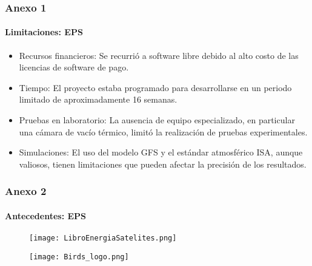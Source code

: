 
\begin{frame}
    \frametitle{Anexo 1}
    \framesubtitle{Limitaciones: EPS}
    \begin{itemize}
        \small
        \item Recursos financieros: Se recurrió a software libre debido al alto costo de las licencias de software de pago.
        \item Tiempo: El proyecto estaba programado para desarrollarse en un periodo limitado de aproximadamente 16 semanas.
        \item Pruebas en laboratorio: La ausencia de equipo especializado, en particular una cámara de vacío térmico, limitó la realización de pruebas experimentales.
        \item Simulaciones: El uso del modelo GFS y el estándar atmosférico ISA, aunque valiosos, tienen limitaciones que pueden afectar la precisión de los resultados.
    \end{itemize}
\end{frame}


\begin{frame}
    \frametitle{Anexo 2}
    \framesubtitle{Antecedentes: EPS}
    \begin{figure}
        \centering
        \begin{minipage}{.5\textwidth}
            \centering
            \texttt{[image: LibroEnergiaSatelites.png]} %
            \label{fig:sat1}
        \end{minipage}\hfill
        \begin{minipage}{.5\textwidth}
            \centering
            \texttt{[image: Birds\_logo.png]} %
            \vspace*{0.25 cm}
            \label{fig:sat2}
        \end{minipage}
    \end{figure}
    \end{frame}


